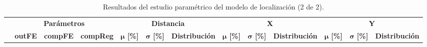\begin{table}[H]
    \centering
    \caption{Resultados del estudio paramétrico del modelo de localización (2 de 2).}
        \label{tab:Results_XY_2}
        \resizebox{20cm}{!} {
        {\renewcommand{\arraystretch}{1.2}
        
        
    \begin{tabular}{|r|r|r|r|l|l|l|l|l|l|l|l|l|}
    \hline
    \rowcolor[HTML]{C0C0C0} 
    \multicolumn{1}{|c|}{\cellcolor[HTML]{C0C0C0}} & 
    \multicolumn{3}{c|}{\cellcolor[HTML]{C0C0C0}\textbf{Parámetros}} & 
    \multicolumn{3}{c|}{\cellcolor[HTML]{C0C0C0}\textbf{Distancia}} & 
    \multicolumn{3}{c|}{\cellcolor[HTML]{C0C0C0}\textbf{X}} &
    \multicolumn{3}{c|}{\cellcolor[HTML]{C0C0C0}\textbf{Y}} 
    
    \\ \cline{2-13} 
    
    \rowcolor[HTML]{EFEFEF} 
    \multicolumn{1}{|c|}{\multirow{-2}{*}{\cellcolor[HTML]{C0C0C0}Id}} & 
    \multicolumn{1}{c|}{\cellcolor[HTML]{EFEFEF}\textbf{outFE}} & 
    \multicolumn{1}{c|}{\cellcolor[HTML]{EFEFEF}\textbf{compFE}} & 
    \multicolumn{1}{c|}{\cellcolor[HTML]{EFEFEF}\textbf{compReg}} & 
    \multicolumn{1}{c|}{\cellcolor[HTML]{EFEFEF}$\bm{\mu}$ \textbf{[\%]}} & 
    \multicolumn{1}{c|}{\cellcolor[HTML]{EFEFEF}$\bm{\sigma}$ \textbf{[\%]}} & 
    \multicolumn{1}{c|}{\cellcolor[HTML]{EFEFEF}\textbf{Distribución}} & 
    \multicolumn{1}{c|}{\cellcolor[HTML]{EFEFEF}$\bm{\mu}$ \textbf{[\%]}} & 
    \multicolumn{1}{c|}{\cellcolor[HTML]{EFEFEF}$\bm{\sigma}$ \textbf{[\%]}} & 
    \multicolumn{1}{c|}{\cellcolor[HTML]{EFEFEF}\textbf{Distribución}} & 
    \multicolumn{1}{c|}{\cellcolor[HTML]{EFEFEF}$\bm{\mu}$ \textbf{[\%]}} & 
    \multicolumn{1}{c|}{\cellcolor[HTML]{EFEFEF}$\bm{\sigma}$ \textbf{[\%]}} & 
    \multicolumn{1}{c|}{\cellcolor[HTML]{EFEFEF}\textbf{Distribución}} \\ \hline
    

\end{tabular}}}
\end{table}
